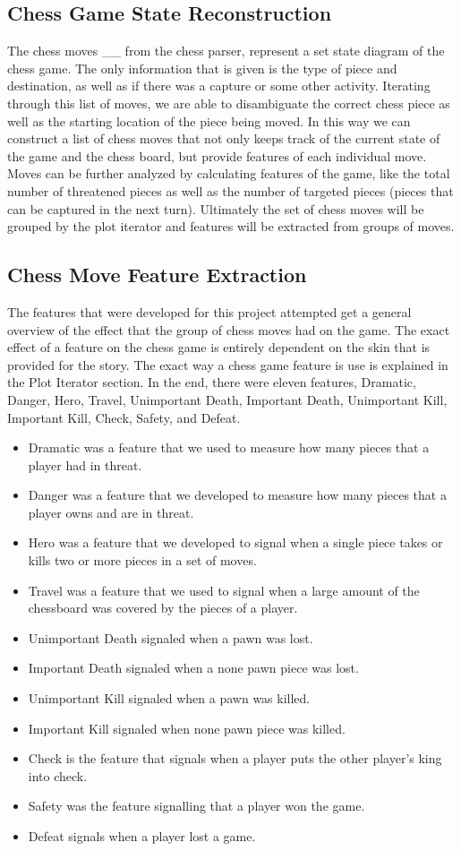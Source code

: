 \documentclass[journal]{./IEEEtran}
\begin{document}
\subsection{Chess Game State Reconstruction} 
The chess moves \_\_ from the chess parser, represent a set state diagram of the chess game. The only information that is given is the type of piece and destination, as well as if there was a capture or some other activity. Iterating through this list of moves, we are able to disambiguate the correct chess piece as well as the starting location of the piece being moved. In this way we can construct a list of chess moves that not only keeps track of the current state of the game and the chess board, but provide features of each individual move. Moves can be further analyzed by calculating features of the game, like the total number of threatened pieces as well as the number of targeted pieces (pieces that can be captured in the next turn). Ultimately the set of chess moves will be grouped by the plot iterator and features will be extracted from groups of moves.

\subsection{Chess Move Feature Extraction}
The features that were developed for this project attempted get a general overview of the effect that the group of chess moves had on the game. The exact effect of a feature on the chess game is entirely dependent on the skin that is provided for the story. The exact way a chess game feature is use is explained in the Plot Iterator section. In the end, there were eleven features, Dramatic, Danger, Hero, Travel, Unimportant Death, Important Death, Unimportant Kill, Important Kill, Check, Safety, and Defeat. 
\begin{itemize}
\item Dramatic was a feature that we used to measure how many pieces that a player had in threat.
\item Danger was a feature that we developed to measure how many pieces that a player owns and are in threat.
\item Hero was a feature that we developed to signal when a single piece takes or kills two or more pieces in a set of moves.
\item Travel was a feature that we used to signal when a large amount of the chessboard was covered by the pieces of a player.
\item Unimportant Death signaled when a pawn was lost.
\item Important Death signaled when a none pawn piece was lost.
\item Unimportant Kill signaled when a pawn was killed.
\item Important Kill signaled when none pawn piece was killed.
\item Check is the feature that signals when a player puts the other player’s king into check.
\item Safety was the feature signalling that a player won the game.
\item Defeat signals when a player lost a game.
\end{itemize}
\end{document}

